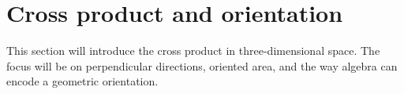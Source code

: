 \section{Cross product and orientation}

This section will introduce the cross product in three-dimensional space. The focus will be on perpendicular directions, oriented area, and the way algebra can encode a geometric orientation.
